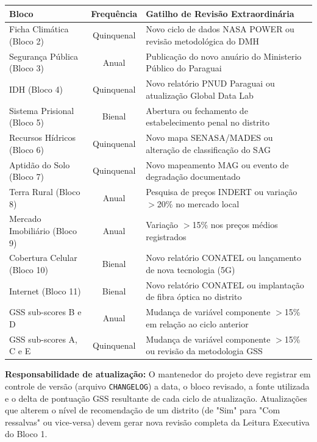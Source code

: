 \renewcommand{\arraystretch}{1.4}
\begin{tabularx}{\linewidth}{|l|c|X|}
\hline
\textbf{Bloco} & \textbf{Frequência} & \textbf{Gatilho de Revisão Extraordinária} \\
\hline
Ficha Climática (Bloco 2)     & Quinquenal   & Novo ciclo de dados NASA POWER ou revisão metodológica do DMH \\
\hline
Segurança Pública (Bloco 3)   & Anual        & Publicação do novo anuário do Ministerio Público do Paraguai \\
\hline
IDH (Bloco 4)                 & Quinquenal   & Novo relatório PNUD Paraguai ou atualização Global Data Lab \\
\hline
Sistema Prisional (Bloco 5)   & Bienal       & Abertura ou fechamento de estabelecimento penal no distrito \\
\hline
Recursos Hídricos (Bloco 6)   & Quinquenal   & Novo mapa SENASA/MADES ou alteração de classificação do SAG \\
\hline
Aptidão do Solo (Bloco 7)     & Quinquenal   & Novo mapeamento MAG ou evento de degradação documentado \\
\hline
Terra Rural (Bloco 8)         & Anual        & Pesquisa de preços INDERT ou variação $>$20\% no mercado local \\
\hline
Mercado Imobiliário (Bloco 9) & Anual        & Variação $>$15\% nos preços médios registrados \\
\hline
Cobertura Celular (Bloco 10)  & Bienal       & Novo relatório CONATEL ou lançamento de nova tecnologia (5G) \\
\hline
Internet (Bloco 11)           & Bienal       & Novo relatório CONATEL ou implantação de fibra óptica no distrito \\
\hline
GSS sub-scores B e D          & Anual        & Mudança de variável componente $>$15\% em relação ao ciclo anterior \\
\hline
GSS sub-scores A, C e E       & Quinquenal   & Mudança de variável componente $>$15\% ou revisão da metodologia GSS \\
\hline
\end{tabularx}
\renewcommand{\arraystretch}{1.0}

\bigskip

\noindent\textbf{Responsabilidade de atualização:} O mantenedor do projeto deve registrar em controle de versão (arquivo \texttt{CHANGELOG}) a data, o bloco revisado, a fonte utilizada e o delta de pontuação GSS resultante de cada ciclo de atualização. Atualizações que alterem o nível de recomendação de um distrito (de "Sim" para "Com ressalvas" ou vice-versa) devem gerar nova revisão completa da Leitura Executiva do Bloco 1.
